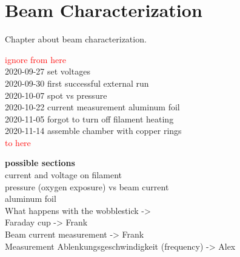 
\chapter{Beam Characterization}
\label{ch:Beam Characterization}

Chapter about beam characterization.

\noindent \textcolor{red}{ignore from here} \\
2020-09-27 set voltages \\
2020-09-30 first successful external run \\
2020-10-07 spot vs pressure \\
2020-10-22 current measurement aluminum foil \\
2020-11-05 forgot to turn off filament heating \\
2020-11-14 assemble chamber with copper rings \\
\textcolor{red}{to here}

\noindent \textbf{possible sections} \\
current and voltage on filament \\
pressure (oxygen exposure) vs beam current \\
aluminum foil \\
What happens with the wobblestick ->  \\
Faraday cup -> Frank \\
Beam current measurement -> Frank \\
Measurement Ablenkungsgeschwindigkeit (frequency) -> Alex \\